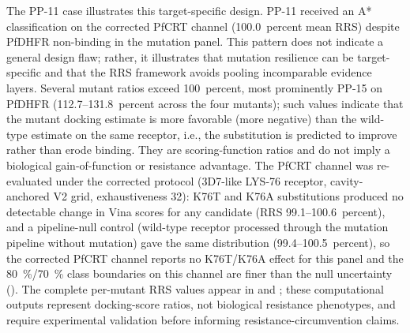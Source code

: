 \documentclass[journal=jcisd8,manuscript=article]{achemso}
\begin{document}
The PP-11 case illustrates this target-specific design. PP-11 received an A* classification on the corrected PfCRT channel (\num{100.0}~percent mean RRS) despite PfDHFR non-binding in the mutation panel. This pattern does not indicate a general design flaw; rather, it illustrates that mutation resilience can be target-specific and that the RRS framework avoids pooling incomparable evidence layers. Several mutant ratios exceed \num{100}~percent, most prominently PP-15 on PfDHFR (\numrange{112.7}{131.8}~percent across the four mutants); such values indicate that the mutant docking estimate is more favorable (more negative) than the wild-type estimate on the same receptor, i.e., the substitution is predicted to improve rather than erode binding. They are scoring-function ratios and do not imply a biological gain-of-function or resistance advantage. The PfCRT channel was re-evaluated under the corrected protocol (3D7-like LYS-76 receptor, cavity-anchored V2 grid, exhaustiveness \num{32}): K76T and K76A substitutions produced no detectable change in Vina scores for any candidate (RRS \numrange{99.1}{100.6}~percent), and a pipeline-null control (wild-type receptor processed through the mutation pipeline without mutation) gave the same distribution (\numrange{99.4}{100.5}~percent), so the corrected PfCRT channel reports no K76T/K76A effect for this panel and the \qty{80}{\percent}/\qty{70}{\percent} class boundaries on this channel are finer than the null uncertainty (). The complete per-mutant RRS values appear in  and ; these computational outputs represent docking-score ratios, not biological resistance phenotypes, and require experimental validation before informing resistance-circumvention claims.
\end{document}
